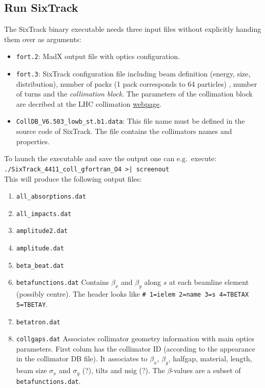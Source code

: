 \documentclass[a4paper, oneside, final]{scrartcl}
\begin{document}
{{\subsection{Run SixTrack}
The SixTrack binary executable needs three input files without explicitly handing them over as arguments:

\begin{itemize}
\item \texttt{fort.2}: MadX output file with optics configuration.
\item \texttt{fort.3}: SixTrack configuration file including beam definition (energy, size, distribution), number of packs (1 pack corresponds to 64 particles) , number of turns and the \textit{collimation block}. The parameters of the collimation block are decribed at the LHC collimation {\href{http://lhc-collimation-project.web.cern.ch/lhc-collimation-project/code-tracking-2012.php}{webpage}}.
\item \texttt{CollDB\_V6.503\_lowb\_st.b1.data}: This file name must be defined in the source code of SixTrack. The file contains the collimators names and properties.
\end{itemize}

To launch the executable and save the output one can e.g.~execute: \\
\texttt{./SixTrack\_4411\_coll\_gfortran\_O4 >| screenout} \\

This will produce the following output files:

\begin{enumerate}
\item \texttt{all\_absorptions.dat}
\item \texttt{all\_impacts.dat}
\item \texttt{amplitude2.dat}
\item \texttt{amplitude.dat}
\item \texttt{beta\_beat.dat}

\item \texttt{betafunctions.dat} Contains $\beta_x$ and $\beta_y$ along $s$ at each beamline element (possibly centre). The header looks like \texttt{\# 1=ielem 2=name 3=s 4=TBETAX 5=TBETAY}.

\item \texttt{betatron.dat}
\item \texttt{collgaps.dat} Associates collimator geometry information with main optics parameters. First colum has the collimator ID (according to the appearance in the collimator DB file). It associates to $\beta_x$, $\beta_y$, halfgap, material, length, beam size $\sigma_x$ and $\sigma_y$ (?), tilts and nsig (?). The $\beta$-values are a subset of \texttt{betafunctions.dat}.


\end{enumerate}}}
\end{document}
